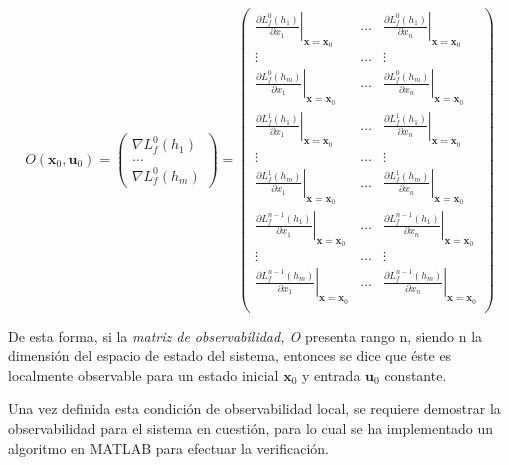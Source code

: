 \begin{equation}
	O(\boldsymbol{x}_0,\boldsymbol{u}_0) = \begin{pmatrix} \nabla L_f^{0}(h_1) \\ \dots \\ \nabla L_f^{0}(h_m) \end{pmatrix} =
	\begin{pmatrix}
		\left.\frac{\partial L_f^{0}(h_1)}{\partial x_1}\right|_{\boldsymbol{x}=\boldsymbol{x}_0} & \dots & \left.\frac{\partial L_f^{0}(h_1)}{\partial x_n}\right|_{\boldsymbol{x}=\boldsymbol{x}_0} \\ \vdots & \dots & \vdots \\
		\left.\frac{\partial L_f^{0}(h_m)}{\partial x_1}\right|_{\boldsymbol{x}=\boldsymbol{x}_0} & \dots & \left.\frac{\partial L_f^{0}(h_m)}{\partial x_n}\right|_{\boldsymbol{x}=\boldsymbol{x}_0} \\
		\left.\frac{\partial L_f^{1}(h_1)}{\partial x_1}\right|_{\boldsymbol{x}=\boldsymbol{x}_0} & \dots & \left.\frac{\partial L_f^{1}(h_1)}{\partial x_n}\right|_{\boldsymbol{x}=\boldsymbol{x}_0} \\ \vdots & \dots & \vdots \\
		\left.\frac{\partial L_f^{1}(h_m)}{\partial x_1}\right|_{\boldsymbol{x}=\boldsymbol{x}_0} & \dots & \left.\frac{\partial L_f^{1}(h_m)}{\partial x_n}\right|_{\boldsymbol{x}=\boldsymbol{x}_0} \\
		\left.\frac{\partial L_f^{n-1}(h_1)}{\partial x_1}\right|_{\boldsymbol{x}=\boldsymbol{x}_0} & \dots & \left.\frac{\partial L_f^{n-1}(h_1)}{\partial x_n}\right|_{\boldsymbol{x}=\boldsymbol{x}_0} \\ \vdots & \dots & \vdots \\
		\left.\frac{\partial L_f^{n-1}(h_m)}{\partial x_1}\right|_{\boldsymbol{x}=\boldsymbol{x}_0} & \dots & \left.\frac{\partial L_f^{n-1}(h_m)}{\partial x_n}\right|_{\boldsymbol{x}=\boldsymbol{x}_0} \\
	\end{pmatrix}
\label{eq:matrizObservabilidad}
\end{equation}

De esta forma, si la \emph{matriz de observabilidad, O} presenta rango n, siendo n la dimensión del espacio de estado del sistema, entonces se dice que éste es localmente observable para un estado inicial $\boldsymbol{x}_0$ y entrada $\boldsymbol{u}_0$ constante. \par

Una vez definida esta condición de observabilidad local, se requiere demostrar la observabilidad para el sistema en cuestión, para lo cual se ha implementado un algoritmo en MATLAB para efectuar la verificación. \par

